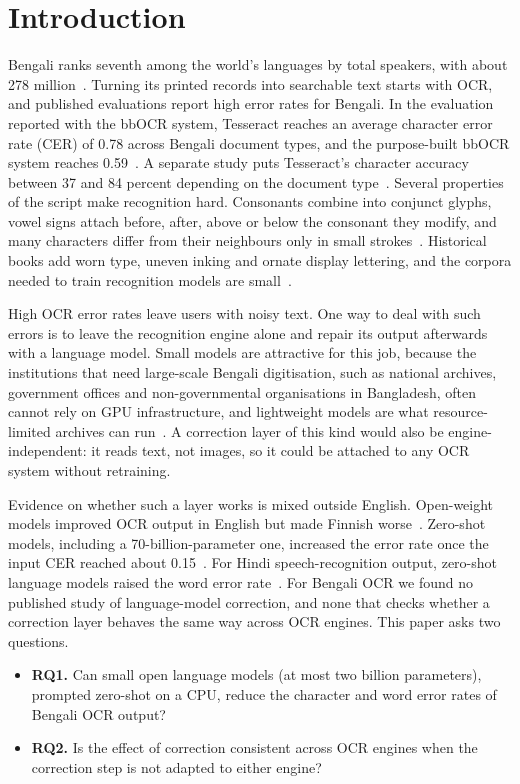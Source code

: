 \documentclass[conference]{IEEEtran}
\begin{document}
\section{Introduction}

Bengali ranks seventh among the world's languages by total speakers, with about 278 million~\cite{eberhard2025ethnologue}. Turning its printed records into searchable text starts with OCR, and published evaluations report high error rates for Bengali. In the evaluation reported with the bbOCR system, Tesseract reaches an average character error rate (CER) of 0.78 across Bengali document types, and the purpose-built bbOCR system reaches 0.59~\cite{zulkarnain2023bbocr}. A separate study puts Tesseract's character accuracy between 37 and 84 percent depending on the document type~\cite{rabby2024enhancement}. Several properties of the script make recognition hard. Consonants combine into conjunct glyphs, vowel signs attach before, after, above or below the consonant they modify, and many characters differ from their neighbours only in small strokes~\cite{rabby2024enhancement}. Historical books add worn type, uneven inking and ornate display lettering, and the corpora needed to train recognition models are small~\cite{zulkarnain2023bbocr}.

High OCR error rates leave users with noisy text. One way to deal with such errors is to leave the recognition engine alone and repair its output afterwards with a language model. Small models are attractive for this job, because the institutions that need large-scale Bengali digitisation, such as national archives, government offices and non-governmental organisations in Bangladesh, often cannot rely on GPU infrastructure, and lightweight models are what resource-limited archives can run~\cite{vershinin2025lightweight}. A correction layer of this kind would also be engine-independent: it reads text, not images, so it could be attached to any OCR system without retraining.

Evidence on whether such a layer works is mixed outside English. Open-weight models improved OCR output in English but made Finnish worse~\cite{kanerva2025nofreelunches}. Zero-shot models, including a 70-billion-parameter one, increased the error rate once the input CER reached about 0.15~\cite{koynov2025opportunities}. For Hindi speech-recognition output, zero-shot language models raised the word error rate~\cite{kumar2026postasr}. For Bengali OCR we found no published study of language-model correction, and none that checks whether a correction layer behaves the same way across OCR engines. This paper asks two questions.
\begin{itemize}
\item \textbf{RQ1.} Can small open language models (at most two billion parameters), prompted zero-shot on a CPU, reduce the character and word error rates of Bengali OCR output?
\item \textbf{RQ2.} Is the effect of correction consistent across OCR engines when the correction step is not adapted to either engine?
\end{itemize}
\end{document}
